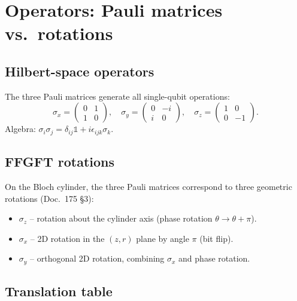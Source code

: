 \section{Operators: Pauli matrices vs.\ rotations}

\subsection{Hilbert-space operators}

The three Pauli matrices generate all single-qubit operations:
\begin{equation}
  \sigma_x = \begin{pmatrix}0 & 1 \\ 1 & 0\end{pmatrix},
  \quad
  \sigma_y = \begin{pmatrix}0 & -i \\ i & 0\end{pmatrix},
  \quad
  \sigma_z = \begin{pmatrix}1 & 0 \\ 0 & -1\end{pmatrix}.
\end{equation}
Algebra: $\sigma_i \sigma_j = \delta_{ij} \mathbb{1} + i\epsilon_{ijk}\sigma_k$.

\subsection{FFGFT rotations}

On the Bloch cylinder, the three Pauli matrices correspond to three
geometric rotations (Doc.~175 §3):
\begin{itemize}[leftmargin=2em,itemsep=2pt,topsep=2pt]
  \item $\sigma_z$ -- rotation about the cylinder axis (phase rotation $\theta \to \theta + \pi$).
  \item $\sigma_x$ -- 2D rotation in the $(z, r)$ plane by angle $\pi$ (bit flip).
  \item $\sigma_y$ -- orthogonal 2D rotation, combining $\sigma_x$ and phase rotation.
\end{itemize}

\subsection{Translation table}

